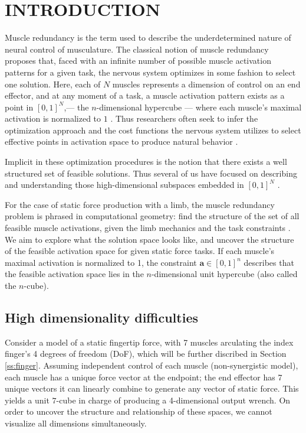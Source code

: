 
\section{INTRODUCTION}

Muscle redundancy is the term used to describe the underdetermined nature of neural control of musculature.
The classical notion of muscle redundancy  proposes that, faced with an infinite number of possible muscle activation patterns for a given task, the nervous system optimizes in some fashion to select one solution.
Here, each of $N$ muscles represents a dimension of control on an end effector, and at any moment of a task, a muscle activation pattern exists as a point in $[0,1]^N$,--- the $n$-dimensional hypercube --- where each muscle's maximal activation is normalized to $1$ \cite{Valero-Cuevas1998Large}.
Thus researchers often seek to infer the optimization approach and the cost functions the nervous system utilizes to select effective points in activation space to produce natural behavior \cite{Chao1978Graphical,Prilutsky2000Muscle,scott2004optimal,todorov2002optimal,crowninshield1981physiologically,higginson2005simulated}. 

Implicit in these optimization procedures is the notion that there exists a well structured set of feasible solutions. Thus several of us have focused on describing and understanding those high-dimensional subspaces  embedded in $[0,1]^N$ \cite{kutch2011muscle,kutch2012challenges,sohn2013cat_bounding_box,Valero-Cuevas1998Large,Valero-Cuevas2015high-dimensional}.

For the case of static force production with a limb, the muscle redundancy problem is phrased in computational geometry: find the structure of the set of all feasible muscle activations, given the limb mechanics and the task constraints \cite{avis1992Pivoting,Valero-Cuevas1998Large,Valero-Cuevas2009mathematical,Valero-Cuevas2015high-dimensional}. We aim to explore what the solution space looks like, and uncover the structure of the feasible activation space for given static force tasks.
If each muscle's maximal activation is normalized to 1, the constraint $\textbf{a} \in [0,1]^n$ describes that the feasible activation space lies in the $n$-dimensional unit hypercube (also called the $n$-cube).%

\subsection{High dimensionality difficulties}
Consider a model of a static fingertip force, with 7 muscles arculating the index finger's 4 degrees of freedom (DoF), which will be further discribed in Section \ref{ss:finger}.
Assuming independent control of each muscle (non-synergistic model), each muscle has a unique force vector at the endpoint; the end effector has 7 unique vectors it can linearly combine to generate any vector of static force.
This yields a unit $7$-cube in charge of producing a 4-dimensional output wrench.
On order to uncover the structure and relationship of these spaces, we cannot visualize all dimensions simultaneously. %

